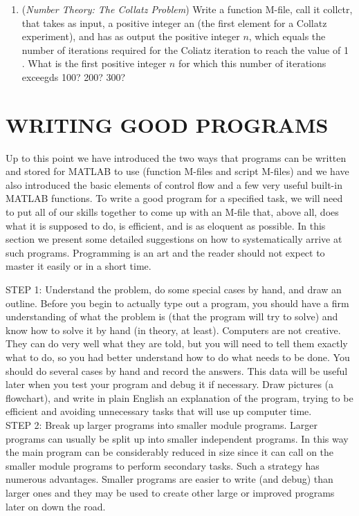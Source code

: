 \documentclass[../main.tex]{subfiles}
\begin{document}
\begin{enumerate}
\item (\emph{Number Theory: The Collatz Problem}) Write a function M-file, call it collctr, that takes as input, a positive integer an (the first element for a Collatz experiment), and has as output the positive integer $n$, which equals the number of iterations required for the Coliatz iteration to reach the value of 1 . What is the first positive integer $n$ for which this number of iterations exceegds 100? 200? 300?

\end{enumerate}

\section{WRITING GOOD PROGRAMS } %
Up to this point we have introduced the two ways that programs can be written and stored for MATLAB to use (function M-files and script M-files) and we have also introduced the basic elements of control flow and a few very useful built-in MATLAB functions. To write a good program for a specified task, we will need to put all of our skills together to come up with an M-file that, above all, does what it is supposed to do, is efficient, and is as eloquent as possible. In this section we present some detailed suggestions on how to systematically arrive at such programs. Programming is an art and the reader should not expect to master it easily or in a short time.

STEP 1: Understand the problem, do some special cases by hand, and draw an outline. Before you begin to actually type out a program, you should have a firm understanding of what the problem is (that the program will try to solve) and know how to solve it by hand (in theory, at least). Computers are not creative. They can do very well what they are told, but you will need to tell them exactly what to do, so you had better understand how to do what needs to be done. You should do several cases by hand and record the answers. This data will be useful later when you test your program and debug it if necessary. Draw pictures (a flowchart), and write in plain English an explanation of the program, trying to be efficient and avoiding unnecessary tasks that will use up computer time.\\

STEP 2: Break up larger programs into smaller module programs. Larger programs can usually be split up into smaller independent programs. In this way the main program can be considerably reduced in size since it can call on the smaller module programs to perform secondary tasks. Such a strategy has numerous advantages. Smaller programs are easier to write (and debug) than larger ones and they may be used to create other large or improved programs later on down the road.\\
\end{document}
